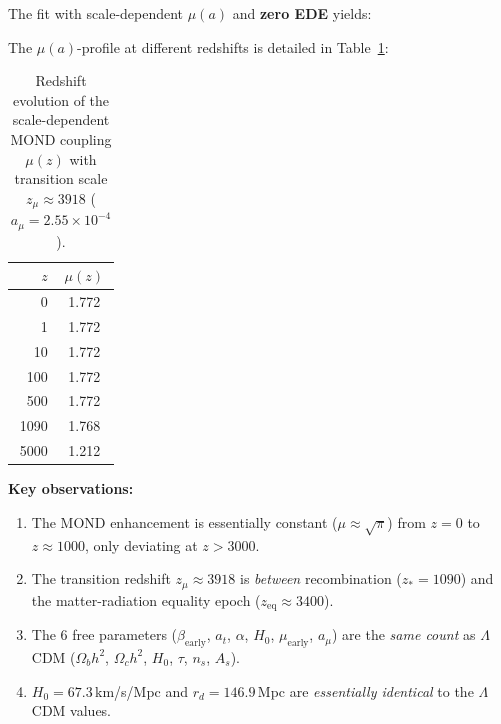 \documentclass[aps,prd,twocolumn,superscriptaddress,nofootinbib,floatfix]{revtex4-2}
\begin{document}
The fit with scale-dependent $\mu(a)$ and \textbf{zero EDE} yields:
\begin{center}
\end{center}

The $\mu(a)$-profile at different redshifts is detailed in Table~\ref{tab:mu_redshift}:

\begin{table}[t]
\centering
\caption{Redshift evolution of the scale-dependent MOND coupling $\mu(z)$ with transition scale $z_\mu \approx 3918$ ($a_\mu = 2.55 \times 10^{-4}$).}
\label{tab:mu_redshift}
\begin{tabular}{rc}
\toprule
$z$ & $\mu(z)$ \\
\midrule
0 & 1.772 \\
1 & 1.772 \\
10 & 1.772 \\
100 & 1.772 \\
500 & 1.772 \\
1090 & 1.768 \\
5000 & 1.212 \\
\bottomrule
\end{tabular}
\end{table}


\textbf{Key observations:}
\begin{enumerate}
\item The MOND enhancement is essentially constant ($\mu \approx \sqrt{\pi}$) from $z = 0$ to $z \approx 1000$, only deviating at $z > 3000$.
\item The transition redshift $z_\mu \approx 3918$ is \textit{between} recombination ($z_* = 1090$) and the matter-radiation equality epoch ($z_{\mathrm{eq}} \approx 3400$).
\item The 6 free parameters ($\beta_{\mathrm{early}}$, $a_t$, $\alpha$, $H_0$, $\mu_{\mathrm{early}}$, $a_\mu$) are the \textit{same count} as $\Lambda$CDM ($\Omega_b h^2$, $\Omega_c h^2$, $H_0$, $\tau$, $n_s$, $A_s$).
\item $H_0 = 67.3$\,km/s/Mpc and $r_d = 146.9$\,Mpc are \textit{essentially identical} to the $\Lambda$CDM values.
\end{enumerate}
\end{document}
